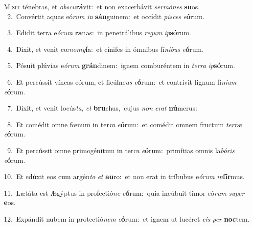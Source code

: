 \lettrine{\initial\textcolor{\initialcolor}{M}}{isit} ténebras, et \textit{obs}\-\textit{cu}\textbf{rá}vit:~\star et non exacerbávit \textit{ser}\-\textit{mó}\textit{nes} \textbf{su}\-os.\\
{\numbfont\textcolor{\numbcolor}{~2.}}~Convértit aquas eó\textit{rum} \textit{in} \textbf{sán}\-guinem:~\star et occídit \textit{pi}\-\textit{sces} \textit{e}\-\textbf{ó}rum.\par
{\numbfont\textcolor{\numbcolor}{~3.}}~Edidit terra e\-\textit{ó}\-\textit{rum} \textbf{ra}\-nas:~\star in penetrálibus \textit{re}\-\textit{gum} \textit{ip}\-\textbf{só}rum.\par
{\numbfont\textcolor{\numbcolor}{~4.}}~Dixit, et venit cœ\-\textit{no}\-\textit{my}\textbf{í}a:~\star et cínifes in ómnibus fí\-\textit{ni}\-\textit{bus} \textit{e}\-\textbf{ó}rum.\par
{\numbfont\textcolor{\numbcolor}{~5.}}~Pósuit plúvias e\-\textit{ó}\-\textit{rum} \textbf{grán}\-dinem:~\star ignem comburéntem in \textit{ter}\-\textit{ra} \textit{ip}\-\textbf{só}rum.\par
{\numbfont\textcolor{\numbcolor}{~6.}}~Et percússit víneas eórum, et ficúlne\textit{as} \textit{e}\-\textbf{ó}rum:~\star et contrívit lignum fí\-\textit{ni}\-\textit{um} \textit{e}\-\textbf{ó}rum.\par
{\numbfont\textcolor{\numbcolor}{~7.}}~Dixit, et venit locús\-\textit{ta}\-, \textit{et} \textbf{bru}\-chus,~\star cujus \textit{non} \textit{e}\-\textit{rat} \textbf{nú}\-merus:\par
{\numbfont\textcolor{\numbcolor}{~8.}}~Et comédit omne fœnum in ter\textit{ra} \textit{e}\-\textbf{ó}rum:~\star et comédit omnem fructum \textit{ter}\-\textit{ræ} \textit{e}\-\textbf{ó}rum.\par
{\numbfont\textcolor{\numbcolor}{~9.}}~Et percússit omne primogénitum in ter\textit{ra} \textit{e}\-\textbf{ó}rum:~\star primítias omnis la\-\textit{bó}\-\textit{ris} \textit{e}\-\textbf{ó}rum.\par
{\numbfont\textcolor{\numbcolor}{10.}}~Et edúxit eos cum argén\textit{to} \textit{et} \textbf{au}\-ro:~\star et non erat in tríbubus e\-\textit{ó}\-\textit{rum} \textit{in}\-\textbf{fír}mus.\par
{\numbfont\textcolor{\numbcolor}{11.}}~Lætáta est Ægýptus in profectió\textit{ne} \textit{e}\-\textbf{ó}rum:~\star quia incúbuit timor eó\textit{rum} \textit{su}\-\textit{per} \textbf{e}\-os.\par
{\numbfont\textcolor{\numbcolor}{12.}}~Expándit nubem in protectió\textit{nem} \textit{e}\-\textbf{ó}rum:~\star et ignem ut lucéret \textit{e}\-\textit{is} \textit{per} \textbf{noc}\-tem.\par
